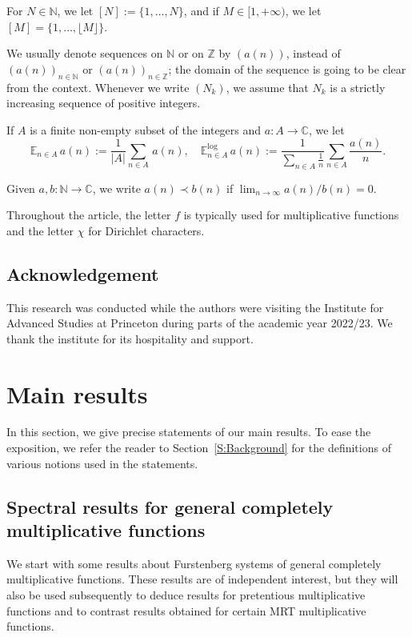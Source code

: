 \documentclass[11pt]{amsart}
\theoremstyle{definition}
\newcommand{\lE}{\mathbb{E}^{\log}}
\newcommand{\C}{{\mathbb C}}
\newcommand{\E}{{\mathbb E}}
\newcommand{\N}{{\mathbb N}}
\newcommand{\Z}{{\mathbb Z}}
\begin{document}
For  $N\in\N$, we let $[N]:=\{1,\dots,N\}$, and if $M\in [1,+\infty)$, we let $[M]=\{1,\ldots, \lfloor M\rfloor\}$.


We usually denote sequences on $\N$ or on $\Z$ by  $(a(n))$, instead of $(a(n))_{n\in\N}$ or $(a(n))_{n\in \Z}$; the domain of the sequence is going to be clear from the context.
Whenever we write  $(N_k)$, we assume that $N_k$ is a strictly increasing sequence of positive integers.

 If $A$ is a finite non-empty subset of the integers and $a\colon A\to \C$, we let
 $$
 \E_{n\in A}\, a(n):=\frac{1}{|A|}\sum_{n\in A}\, a(n), \quad \lE_{n\in A}\, a(n):=\frac{1}{\sum_{n\in A}\frac{1}{n}}\sum_{n\in A}\frac{a(n)}{n}.
 $$

Given  $a,b\colon \N\to \C$, we write $a(n)\prec b(n)$  if $\lim_{n\to \infty} a(n)/b(n)=0$.

 Throughout the article, the letter $f$ is typically  used for multiplicative functions  and the letter $\chi$ for Dirichlet characters.



\subsection*{Acknowledgement}
This research was conducted while the authors were visiting the
 Institute for Advanced Studies at Princeton during parts of the academic year 2022/23. We thank the institute for its hospitality and support.






\section{Main results}\label{S:Results}
In this section, we give precise statements of our main results. To ease the exposition, we refer the  reader to  Section~\ref{S:Background} for the definitions of various  notions used in the statements.
 \subsection{Spectral results for general  completely multiplicative functions}
 We start with some results about Furstenberg systems
of general completely multiplicative functions.
 These results  are of independent interest, but they will also  be used subsequently to deduce results  for pretentious multiplicative functions and to  contrast results obtained for certain MRT multiplicative functions.
\end{document}
